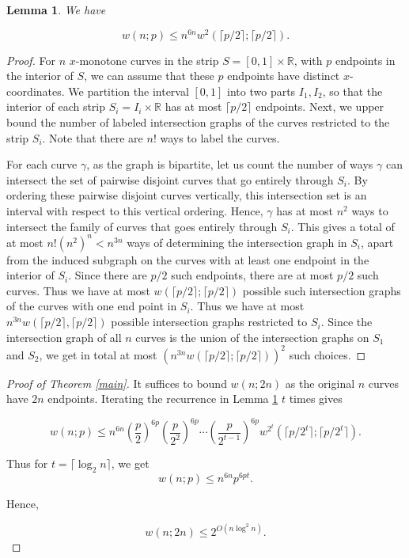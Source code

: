 \documentclass[11pt]{article}
\theoremstyle{plain}
\newtheorem{lemma}[theorem]{Lemma}
\theoremstyle{definition}
\theoremstyle{remark}
\begin{document}

 


\begin{lemma}\label{rec}
We have

$$w(n;p) \leq n^{6n}w^2(\lceil p/2\rceil;\lceil p/2\rceil).$$


\end{lemma}



\begin{proof}

For $n$ $x$-monotone curves in the strip $S = [0,1]\times \mathbb{R}$, with $p$ endpoints in the interior of $S$, we can assume that these $p$ endpoints have distinct $x$-coordinates. We partition the interval $[0,1]$ into two parts $I_1,I_2$, so that the interior of each strip $S_i = I_i\times \mathbb{R}$ has at most $\lceil p/2\rceil$ endpoints. Next, we upper bound the number of labeled intersection graphs of the curves restricted to the strip $S_i$. Note that there are $n!$ ways to label the curves. 

For each curve $\gamma$, as the graph is bipartite, let us count the number of ways $\gamma$ can intersect the set of pairwise disjoint curves that go entirely through $S_i$.  By ordering these pairwise disjoint curves  vertically, this intersection set is an interval with respect to this vertical ordering.  Hence, $\gamma$ has at most $n^2$ ways to intersect the family of curves that goes entirely through $S_i$. This gives a total of at most $n!(n^2)^n < n^{3n}$ ways of determining the intersection graph in $S_i$, apart from the induced subgraph on the curves with at least one endpoint in the interior of $S_i$.  Since there are $p/2$ such endpoints, there are at most $p/2$ such curves. Thus we have at most $w(\lceil p/2\rceil;\lceil p/2\rceil)$ possible such intersection graphs of the curves with one end point in $S_i$. Thus we have at most $n^{3n}w(\lceil p/2\rceil,\lceil p/2\rceil)$ possible intersection graphs restricted to $S_i$.  Since the intersection graph of all $n$ curves is the union of the intersection graphs on $S_1$ and $S_2$, we get in total at most $(n^{3n}w(\lceil p/2\rceil;\lceil p/2\rceil))^2$ such choices.  \end{proof}


\begin{proof}[Proof of Theorem \ref{main}] It suffices to bound $w(n;2n)$ as the original $n$ curves have $2n$ endpoints.  Iterating the recurrence in Lemma \ref{rec} $t$ times gives 

 

$$w(n;p) \leq n^{6n}\left(\frac{p}{2}\right)^{6p}\left(\frac{p}{2^2}\right)^{6p}\cdots \left(\frac{p}{2^{t-1}}\right)^{6p} w^{2^t}(\lceil p/2^{t }\rceil;\lceil p/2^{t}\rceil).$$

 

\noindent Thus for $t= \lceil \log_2 n\rceil $, we get   $$w(n;p) \leq n^{6n}p^{6pt}.$$

 

\noindent Hence,

$$w(n;2n)\leq 2^{O(n\log^2 n)}.$$

\end{proof}
\end{document}
